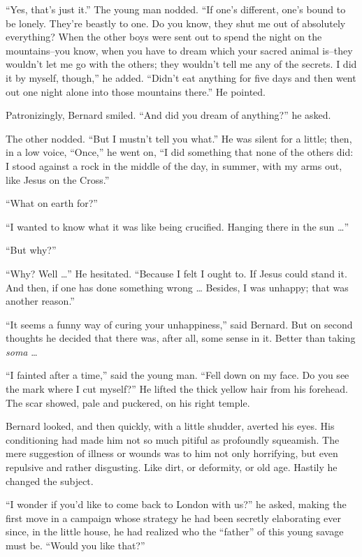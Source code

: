 \documentclass[12pt]{report}
\begin{document}
``Yes, that's just it.'' The young man nodded. ``If one's different,
one's bound to be lonely. They're beastly to one. Do you know, they shut
me out of absolutely everything? When the other boys were sent out to
spend the night on the mountains--you know, when you have to dream which
your sacred animal is--they wouldn't let me go with the others; they
wouldn't tell me any of the secrets. I did it by myself, though,'' he
added. ``Didn't eat anything for five days and then went out one night
alone into those mountains there.'' He pointed.

Patronizingly, Bernard smiled. ``And did you dream of anything?'' he
asked.

The other nodded. ``But I mustn't tell you what.'' He was silent for a
little; then, in a low voice, ``Once,'' he went on, ``I did something
that none of the others did: I stood against a rock in the middle of the
day, in summer, with my arms out, like Jesus on the Cross.''

``What on earth for?''

``I wanted to know what it was like being crucified. Hanging there in
the sun \ldots{}''

``But why?''

``Why? Well \ldots{}'' He hesitated. ``Because I felt I ought to. If
Jesus could stand it. And then, if one has done something wrong \ldots{}
Besides, I was unhappy; that was another reason.''

``It seems a funny way of curing your unhappiness,'' said Bernard. But
on second thoughts he decided that there was, after all, some sense in
it. Better than taking \emph{soma} \ldots{}

``I fainted after a time,'' said the young man. ``Fell down on my face.
Do you see the mark where I cut myself?'' He lifted the thick yellow
hair from his forehead. The scar showed, pale and puckered, on his right
temple.

Bernard looked, and then quickly, with a little shudder, averted his
eyes. His conditioning had made him not so much pitiful as profoundly
squeamish. The mere suggestion of illness or wounds was to him not only
horrifying, but even repulsive and rather disgusting. Like dirt, or
deformity, or old age. Hastily he changed the subject.

``I wonder if you'd like to come back to London with us?'' he asked,
making the first move in a campaign whose strategy he had been secretly
elaborating ever since, in the little house, he had realized who the
``father'' of this young savage must be. ``Would you like that?''
\end{document}
